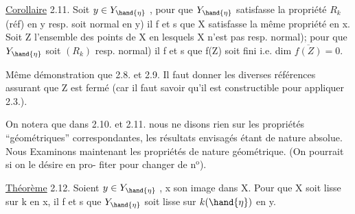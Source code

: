 
\uline{Corollaire} 2.11. Soit $y\in Y_{\hand{\eta}}$ , pour que $Y_{\hand{\eta}}$  satisfasse la propriété
$R_k$ (réf) en y\hand{,} resp. soit normal en y) il f et s que X satisfasse
la même propriété en x.  Soit Z l'ensemble des points de X en
lesquels X n'est pas resp.  normal); pour que $Y_{\hand{\eta}}$ soit
 $(R_k)$\hand{,} resp. normal) il f et s que f(Z) soit fini i.e. dim $\overline{f(Z)}=0$.

 Même démonstration que 2.8. et 2.9. Il faut donner les diverses
références assurant que Z est fermé (car il faut savoir qu'il est
constructible pour appliquer 2.3.).

 On notera que dans 2.10. et 2.11. nous ne disons rien
sur les propriétés ``géométriques'' correspondantes, les résultats
envisagés étant de nature absolue. Nous Examinons maintenant les
propriétés de nature géométrique. (On pourrait si on le désire en pro-%
fiter pour changer de n$^{\text{o}}$).

\uline{Théorème} 2.12. Soient $y\in Y_{\hand{\eta}}$ , x son image dans X. Pour que X soit
lisse sur k en x, il f et s que $Y_{\hand{\eta}}$ soit lisse sur $k(\hand{\eta})$ en y.

